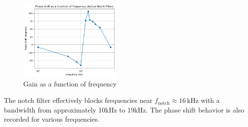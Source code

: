 \documentclass{article}
\begin{document}
\begin{figure}[H]
    \centering
    \includegraphics[width=0.45\textwidth]{img/Lab 9/1_5.png} %
    \caption{Gain as a function of frequency}
\end{figure}

The notch filter effectively blocks frequencies near 
\( f_{\text{notch}} \approx 16\,\text{kHz} \) with a bandwidth 
from approximately 10kHz to 19kHz. The phase shift behavior is 
also recorded for various frequencies.
\end{document}
